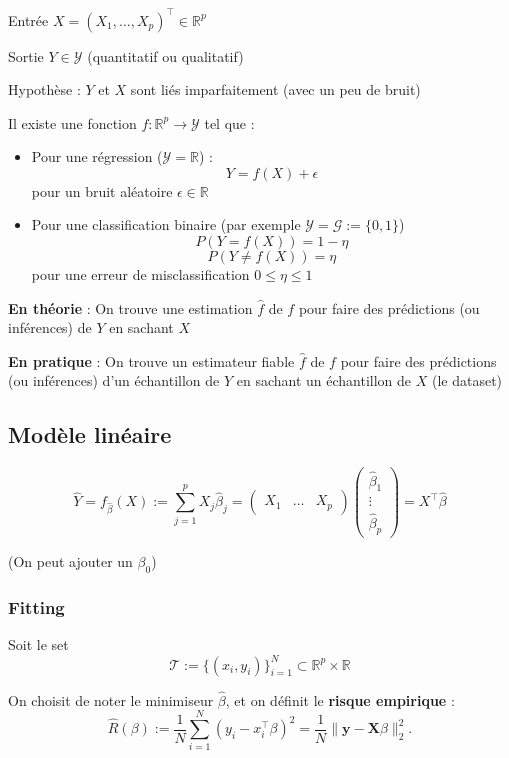 \documentclass[12pt,a4paper]{article}
\begin{document}
Entrée $X = (X_1,\dots,X_p)^\top \in \mathbb{R}^p$

Sortie $Y \in \mathcal{Y}$ (quantitatif ou qualitatif)

Hypothèse : $Y$ et $X$ sont liés imparfaitement (avec un peu de bruit)

Il existe une fonction $f : \mathbb{R}^p \rightarrow \mathcal{Y}$ tel que :
\begin{itemize}
    \item Pour une régression ($\mathcal{Y} = \mathbb{R}$) :
    $$Y = f(X) + \epsilon$$
    pour un bruit aléatoire $\epsilon \in \mathbb{R}$
    \item Pour une classification binaire (par exemple $\mathcal{Y} = \mathcal{G} := \{0,1\}$)
    $$P(Y = f(X)) = 1 - \eta$$
    $$P(Y \neq f(X)) = \eta$$
    pour une erreur de misclassification $0 \leq \eta \leq 1$
\end{itemize}

\textbf{En théorie} : On trouve une estimation $\hat{f}$ de $f$ pour faire des prédictions (ou inférences) de $Y$ en sachant $X$

\textbf{En pratique} : On trouve un estimateur fiable $\hat{f}$ de $f$ pour faire des prédictions (ou inférences) d'un échantillon de $Y$ en sachant un échantillon de $X$ (le dataset)


\subsection{Modèle linéaire}

$$\hat{Y} = f_{\hat{\beta}} (X) := \sum_{j=1}^p X_j \hat{\beta}_j = \begin{pmatrix}X_1 & \dots & X_p\end{pmatrix} \begin{pmatrix}\hat{\beta}_1 \\ \vdots \\ \hat{\beta}_p\end{pmatrix} = X^\top \hat{\beta}$$

(On peut ajouter un $\beta_0$)

\medskip

\subsubsection{Fitting}

Soit le set
$$\mathcal{T} := \{(x_i, y_i)\}_{i=1}^N \subset \mathbb{R}^p \times \mathbb{R}$$

On choisit de noter le minimiseur $\hat{\beta}$, et on définit le \textbf{risque empirique} :
$$\hat{R}(\beta) := \frac{1}{N} \sum_{i=1}^{N} (y_i - x_i^\top \beta)^2 = \frac{1}{N} \| \mathbf{y} - \mathbf{X}\beta \|_2^2.$$
\end{document}
